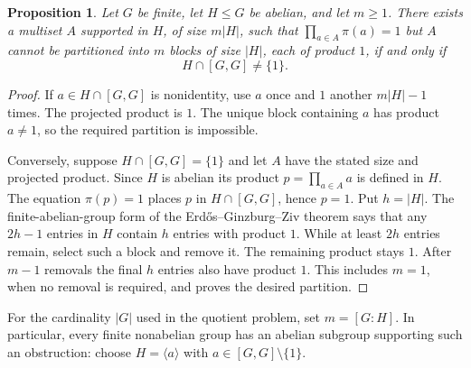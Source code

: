 \documentclass[11pt]{article}
\newtheorem{proposition}[theorem]{Proposition}
\begin{document}
\begin{proposition}\label{prop:subgroup}
Let $G$ be finite, let $H\leq G$ be abelian, and let $m\geq1$.
There exists a multiset $A$ supported in $H$, of size $m|H|$, such that
$\prod_{a\in A}\pi(a)=1$ but $A$ cannot be partitioned into $m$
blocks of size $|H|$, each of product $1$, if and only if
\[
 H\cap[G,G]\ne\{1\}.
\]
\end{proposition}
\begin{proof}
If $a\in H\cap[G,G]$ is nonidentity, use $a$ once and $1$ another
$m|H|-1$ times. The projected product is $1$. The unique block containing
$a$ has product $a\ne1$, so the required partition is impossible.

Conversely, suppose $H\cap[G,G]=\{1\}$ and let $A$ have the stated
size and projected product. Since $H$ is abelian its product
$p=\prod_{a\in A}a$ is defined in $H$. The equation $\pi(p)=1$
places $p$ in $H\cap[G,G]$, hence $p=1$.
Put $h=|H|$. The finite-abelian-group form of the
Erd\H{o}s--Ginzburg--Ziv theorem says that any $2h-1$ entries in $H$
contain $h$ entries with product $1$.
While at least $2h$ entries remain, select such a block and remove it.
The remaining product stays $1$. After $m-1$ removals the final $h$
entries also have product $1$. This includes $m=1$, when no removal
is required, and proves the desired partition.
\end{proof}
For the cardinality $|G|$ used in the quotient problem, set $m=[G:H]$.
In particular, every finite nonabelian group has an abelian subgroup
supporting such an obstruction: choose $H=\langle a\rangle$ with
$a\in[G,G]\setminus\{1\}$.
\end{document}

